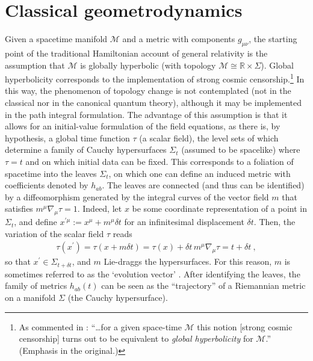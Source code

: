 \documentclass[12pt]{iopart}
\def\eq#1{\begin{equation}\begin{aligned}#1\end{aligned}\end{equation}}
\begin{document}
\section{\label{sec:classical-geomd}Classical geometrodynamics}
Given a spacetime manifold $\mathcal{M}$ and a metric with components $g_{\mu\nu}$, the starting point of the traditional Hamiltonian account of general relativity is the assumption that $\mathcal{M}$ is globally hyperbolic (with topology $\mathcal{M} \cong \mathbb{R}\times\Sigma$). Global hyperbolicity corresponds to the implementation of strong cosmic censorship.\footnote{As commented in \citet[p. 236]{Penrose:1999vj}: ``\ldots for a given space-time ${\mathcal M}$ this notion [strong cosmic censorship] turns out to be equivalent to {\em global hyperbolicity} for ${\mathcal M}$.'' (Emphasis in the original.)} In this way, the phenomenon of topology change is not contemplated (not in the classical nor in the canonical quantum theory), although it may be implemented in the path integral formulation. The advantage of this assumption is that it allows for an initial-value formulation of the field equations, as there is, by hypothesis, a global time function $\tau$ (a scalar field), the level sets of which  determine a family of Cauchy hypersurfaces $\Sigma_t$ (assumed to be spacelike) where $\tau = t$ and on which initial data can be fixed. This corresponds to a foliation of spacetime into the leaves $\Sigma_t$, on which one can define an induced metric with coefficients denoted by $h_{ab}$. The leaves are connected (and thus can be identified) by a diffeomorphism generated by the integral curves of the vector field $m$ that satisfies $m^{\mu}\nabla_{\mu}\tau = 1$. Indeed, let $x$ be some coordinate representation of a point in $\Sigma_t$, and define $x^{\prime\mu} := x^{\mu}+m^{\mu}\delta t$ for an infinitesimal displacement $\delta t$. Then, the variation of the scalar field $\tau$ reads
\eq{\label{eq:evol-vector}
\tau(x^{\prime}) = \tau(x+ m\delta t) = \tau(x)+\delta t\, m^{\mu}\nabla_{\mu}\tau = t+\delta t \ ,
}
so that $x^{\prime}\in\Sigma_{t+\delta t}$, and $m$ Lie-draggs the hypersurfaces. For this reason, $m$ is sometimes referred to as the `evolution vector' \citep{Gourgoulhon}. After identifying the leaves, the family of metrics $h_{ab}(t)$ can be seen as the ``trajectory'' of a Riemannian metric on a manifold $\Sigma$ (the Cauchy hypersurface).
\end{document}

